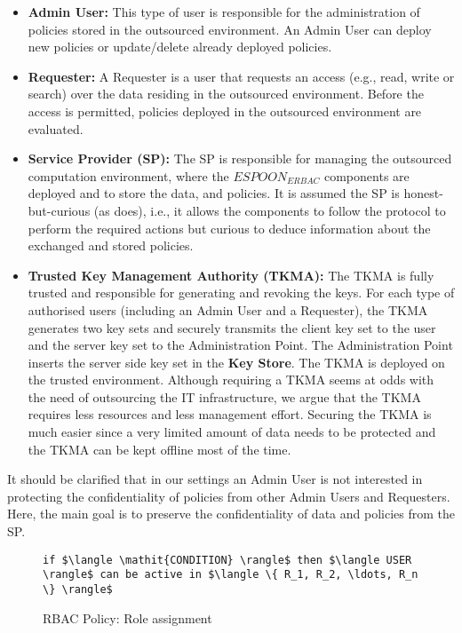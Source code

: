 \documentclass[final,5p,times,twocolumn]{elsarticle}
\newcommand{\Keywords}{\lstset{keywords={if,then,can,be,active,in,execute}}}
\begin{document}
\begin{itemize}

\item \textbf{Admin User:} This type of user is responsible for the administration of policies stored in the outsourced environment. An Admin User can deploy new policies or update/delete already deployed policies.

\item \textbf{Requester:} A Requester is a user that requests an access (e.g., read, write or search) over the data residing in the outsourced environment. Before the access is permitted, policies deployed in the outsourced environment are evaluated.

\item \textbf{Service Provider (SP):} The SP is responsible for managing the outsourced computation environment, where the $\mathit{ESPOON_{ERBAC}}$ components are deployed and to store the data, and policies. It is assumed the SP is honest-but-curious (as \cite{Vimercati2007} does), i.e., it allows the components to follow the protocol to perform the required actions but curious to deduce information about the exchanged and stored policies.

\item \textbf{Trusted Key Management Authority (TKMA):} The TKMA is fully trusted and responsible for generating and revoking the keys. For each type of authorised users (including an Admin User and a Requester), the TKMA generates two key sets and securely transmits the client key set to the user and the server key set to the Administration Point. The Administration Point inserts the server side key set in the \textbf{Key Store}. The TKMA is deployed on the trusted environment. Although requiring a TKMA seems at odds with the need of outsourcing the IT infrastructure, we argue that the TKMA requires less resources and less management effort. Securing the TKMA is much easier since a very limited amount of data needs to be protected and the TKMA can be kept offline most of the time.

\end{itemize}

It should be clarified that in our settings an Admin User is not interested in protecting the confidentiality of policies from other Admin Users and Requesters. Here, the main goal is to preserve the confidentiality of data and policies from the SP.

\begin{figure}
\Keywords
\begin{lstlisting}[style=AMMA,numbers=none,breaklines,mathescape,rulesepcolor=\color{black}]
if $\langle \mathit{CONDITION} \rangle$ then $\langle USER \rangle$ can be active in $\langle \{ R_1, R_2, \ldots, R_n \} \rangle$

\end{lstlisting}
\caption{RBAC Policy: Role assignment}
\label{fig:policy-role-assignment}
\end{figure}
\end{document}
